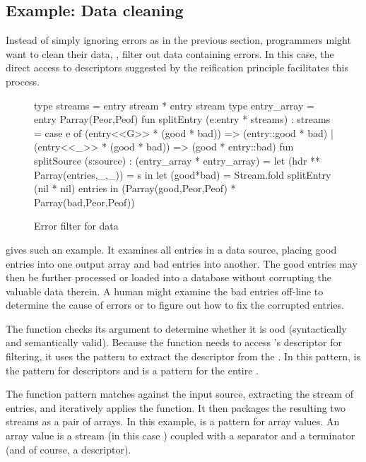 \subsection{Example: Data cleaning}
Instead of simply ignoring errors as in the previous section,
programmers might want to clean their data, \ie{}, filter out data containing errors. In this case, the direct access to descriptors suggested by the reification principle facilitates this process.

\begin{figure}
\begin{code}
type streams = entry stream * entry stream
type entry\_array = entry Parray(Peor,Peof)
\mbox{}
fun splitEntry (e:entry * streams) : streams =
  case e of
    (entry<<G>> * (good * bad)) => (entry::good * bad)
  | (entry<<_>> * (good * bad)) => (good * entry::bad)
\mbox{}
fun splitSource (s:source) : (entry\_array * entry\_array) =
    let (hdr ** Parray(entries,_,_)) = s in
    let (good*bad) = Stream.fold splitEntry (nil * nil) entries in
    (Parray(good,Peor,Peof) * Parray(bad,Peor,Peof))     
\end{code}
\caption{Error filter for \dibbler{} data}
\label{fig:ex-data-clean}
\end{figure}

 gives such an example. 
It examines all entries in a \dibbler{} data source, placing good entries into one output array and bad entries into another.
The good entries
may then be further processed or loaded into a database
without corrupting the valuable data therein.  A human might examine
the bad entries off-line to determine the cause of errors or to
figure out how to fix the corrupted entries.

The  function checks its argument  to
determine whether it is ood (syntactically and semantically
valid).  Because the function needs to access 's descriptor for filtering,
it uses the   pattern to extract the descriptor from
the \pvalue{}.  In this pattern,  is the pattern for
descriptors and  is a pattern for the entire \pvalue{}.

The  function pattern matches against the input
source, extracting the stream of entries, and iteratively applies the
 function.  It then packages the resulting two streams as a pair of arrays. In this example, 
is a pattern for array values.  An array value is a stream (in this
case ) coupled with a separator and a terminator (and of course, a descriptor).  


